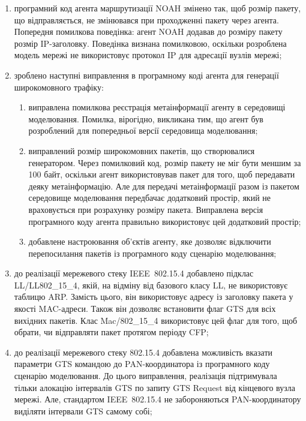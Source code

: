 \documentclass[a4paper,ukrainian,utf8,nocolumnsxix,floatsection,equationsection]{eskdtext}
\newcommand{\iee}[0]{IEEE~802.15.4\xspace}
\begin{document}
\begin{enumerate}

	\item програмний код агента маршрутизації NOAH змінено так, щоб розмір пакету, що відправляється, не змінювався при проходженні пакету через агента. Попередня помилкова поведінка: агент NOAH додавав до розміру пакету розмір IP-заголовку. Поведінка визнана помилковою, оскільки розроблена модель мережі не використовує протокол IP для адресації вузлів мережі; 

	\item зроблено наступні виправлення в програмному коді агента для генерації широкомовного трафіку:
	\begin{enumerate}
		\item виправлена помилкова реєстрація метаінформації агенту в середовищі моделювання. Помилка, вірогідно, викликана тим, що агент був розроблений для попередньої версії середовища моделювання;
		
		\item виправлений розмір широкомовних пакетів, що створювалися генератором. Через помилковий код, розмір пакету не міг бути меншим за 100 байт, оскільки агент використовував пакет для того, щоб передавати деяку метаінформацію. Але для передачі метаінформації разом із пакетом середовище моделювання передбачає додатковий простір, який не враховується при розрахунку розміру пакета. Виправлена версія програмного коду агента правильно використовує цей додатковий простір;
		
		\item добавлене настроювання об'єктів агенту, яке дозволяє відключити перепосилання пакетів із програмного коду сценарію моделювання;
	\end{enumerate}

	\item до реалізації мережевого стеку \iee добавлено підклас LL/LL802\_15\_4, якій, на відміну від базового класу LL, не використовує таблицю ARP. Замість цього, він використовує адресу із заголовку пакета у якості MAC-адреси. Також він дозволяє встановити флаг GTS для всіх вихідних пакетів. Клас Mac/802\_15\_4 використовує цей флаг для того, щоб обрати, чи відправляти пакет протягом періоду CFP; 

	\item до реалізації мережевого стеку 802.15.4 добавлена можливість вказати параметри GTS командою до PAN-координатора із програмного коду сценарію моделювання. До цього виправлення, реалізація підтримувала тільки алокацію інтервалів GTS по запиту GTS Request від кінцевого вузла мережі. Але, стандартом \iee не забороняються PAN-координатору виділяти інтервали GTS самому собі;



\end{enumerate}
\end{document}
